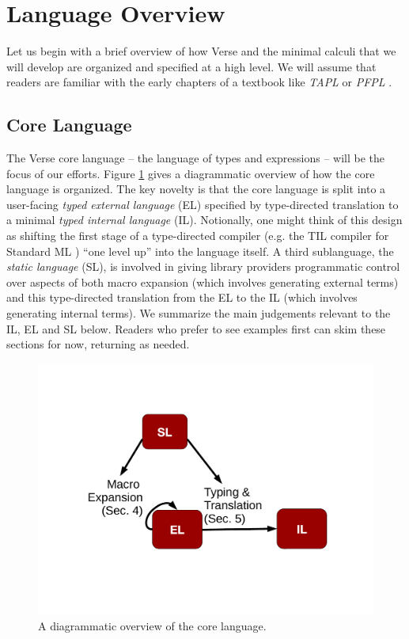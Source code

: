 \section{Language Overview}\label{sec:verse}
Let us begin with a brief overview of how Verse and the minimal calculi that we will develop are organized and specified at a high level. We will assume that readers are familiar with the early chapters of a textbook like \emph{TAPL} \cite{tapl} or \emph{PFPL} \cite{pfpl}.%

\subsection{Core Language}
The Verse core language -- the language of types and expressions -- will be the focus of our efforts. Figure \ref{fig:overview} gives a diagrammatic overview of how the core language is organized. The key novelty is that the core language is split into a user-facing \emph{typed external language} (EL) specified by type-directed translation to a minimal \emph{typed internal language} (IL). Notionally, one might think of this design as shifting the first stage of a type-directed compiler (e.g. the TIL compiler for Standard ML \cite{tarditi+:til-OLD})  ``one level up'' into the language itself. A third sublanguage, the \emph{static language} (SL), is involved in giving library providers programmatic control over aspects of both macro expansion (which involves generating external terms) and this type-directed translation from the EL to the IL (which involves generating internal terms). %
We summarize the main judgements relevant to the IL, EL and SL below. Readers who prefer to see examples first can skim these sections for now, returning as needed.

\begin{figure}
\includegraphics[scale=0.5,clip=true,trim=0 120 0 120]{overview.pdf}\vspace{-10px}
\caption{A diagrammatic overview of the core language.}
\vspace{5px}
\label{fig:overview}
\end{figure}

